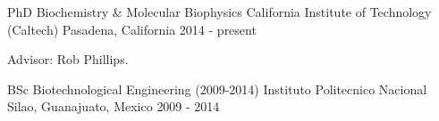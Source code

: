 

\begin{cventries}

  \cventry
    {PhD Biochemistry \& Molecular Biophysics} %
    {California Institute of Technology (Caltech)} %
    {Pasadena, California} %
    {2014 - present} %
    {
      \begin{cvitems} %
        \item {Advisor: Rob Phillips.}
      \end{cvitems}
    }

  \cventry
    {BSc Biotechnological Engineering (2009-2014)} %
    {Instituto Politecnico Nacional} %
    {Silao, Guanajuato, Mexico} %
    {2009 - 2014} %
    {}
\end{cventries}